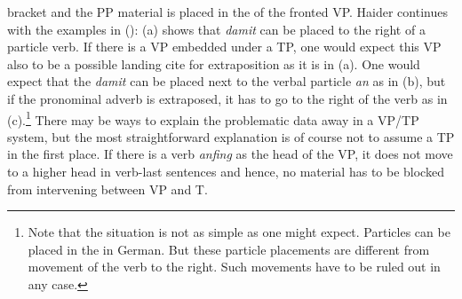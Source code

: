  bracket and the PP material is placed in the \nf of the fronted VP.
Haider continues with the examples in ():
\eal
{}
\zl
(a) shows that \emph{damit} can be placed to the right of a particle verb. If there is a VP
embedded under a TP, one would expect this VP also to be a possible landing cite 
for extraposition as it is in (a). One would expect that the \emph{damit} can be placed next
to the verbal particle \emph{an} as in (b), but if the pronominal adverb is extraposed, it
has to go to the right of the verb as in (c).\footnote{
Note that the situation is not as simple as one might expect. Particles can be placed in the
\mf in German. But these particle placements are different from movement of the verb to the
right. Such movements have to be ruled out in any case.%
} There may be ways to explain the problematic data away in a
VP/TP system, but the most straightforward explanation is of course not to assume a TP in the first
place. If there is a verb \emph{anfing} as the head of the VP, it does not move to a higher head in
verb-last sentences and hence, no material has to be blocked from intervening between VP and T.


\clearpage




